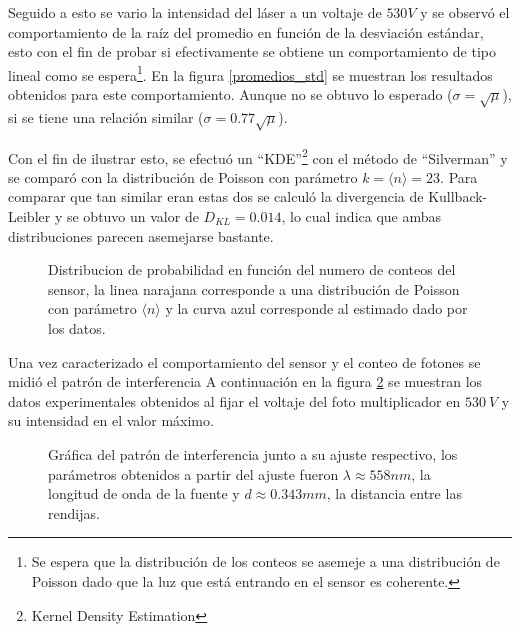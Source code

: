 \documentclass[%
 reprint,
 amsmath,amssymb,
 aps,
]{revtex4-1}
\begin{document}
{Seguido a esto se vario la intensidad del láser a un voltaje de $530 V$ y se observó el comportamiento de la raíz del promedio en función de la desviación estándar, esto con el fin de probar si efectivamente se obtiene un comportamiento de tipo lineal como se espera\footnote{Se espera que la distribución de los conteos se asemeje a una distribución de Poisson dado que la luz que está entrando en el sensor es coherente.}. En la figura \ref{promedios_std} se muestran los resultados obtenidos para este comportamiento. Aunque no se obtuvo lo esperado ($\sigma=\sqrt{\mu}$), si se tiene una relación similar ($\sigma=0.77\sqrt{\mu}$).


Con el fin de ilustrar esto, se efectuó un ``KDE''\footnote{Kernel Density Estimation} con el método de ``Silverman'' y se comparó con la distribución de Poisson con parámetro $k=\langle n\rangle=23$. Para comparar que tan similar eran estas dos se calculó la divergencia de Kullback-Leibler y se obtuvo un valor de $D_{KL}=0.014$, lo cual indica que ambas distribuciones parecen asemejarse bastante.

\begin{figure}[h]
\caption{\label{distribucion} Distribucion de probabilidad en función del numero de conteos del sensor, la linea narajana corresponde a una distribución de Poisson con parámetro $\langle n\rangle$ y la curva azul corresponde al estimado dado por los datos.}
\end{figure}
Una vez caracterizado el comportamiento del sensor y el conteo de fotones se midió el patrón de interferencia A continuación en la figura \ref{interferencia_laserverde} se muestran los datos experimentales obtenidos al fijar el voltaje del foto multiplicador en $530\ V$ y su intensidad en el valor máximo.
\begin{figure}[h]
\caption{\label{interferencia_laserverde} Gráfica del patrón de interferencia junto a su ajuste respectivo, los parámetros obtenidos a partir del ajuste fueron $\lambda\approx 558 nm$, la longitud de onda de la fuente y $d\approx 0.343 mm$, la distancia entre las rendijas.}
\end{figure}


}
\end{document}
